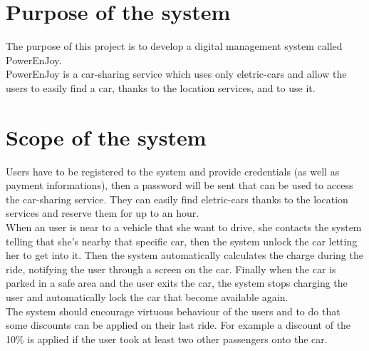 \section{Purpose of the system}
The purpose of this project is to develop a digital management system called PowerEnJoy. 
\\PowerEnJoy is a car-sharing service which uses only eletric-cars and allow the users to easily find a car, thanks to the location services, and to use it. 

\section{Scope of the system}
Users have to be registered to the system and provide credentials (as well as payment informations), then a password will be sent that can be used to access the car-sharing service. They can easily find eletric-cars thanks to the location services and reserve them for up to an hour. 
\\When an user is near to a vehicle that she want to drive, she contacts the system telling that she's nearby that specific car, then the system unlock the car letting her to get into it. 
Then the system automatically calculates the charge during the ride, notifying the user through a screen on the car. 
Finally when the car is parked in a safe area and the user exits the car, the system stops charging the user and automatically lock the car that become available again.
\\The system should encourage virtuous behaviour of the users and to do that some discounts can be applied on their last ride. For example a discount of the 10\% is applied if the user took at least two other passengers onto the car. 
\begin{comment}
Other discounts are applied if a car is left with no more than 50\% of the battery empty or if the user left the car in a special park where it can be recharged(20\%) 
and she takes care of plugging the car into the power grid (30\%). 
\\On the other side the system charges 30\% more on the last ride if the car is left at more than 3 Km from the nearest power grid station or with more than 80\% of the battery empty in order to compensate for the cost required to re-charge the car on-site.
\end{comment}

